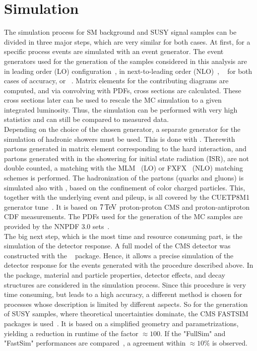 \section{Simulation}
The simulation process for SM background and SUSY signal samples can be divided in three major steps, which are very similar for both cases. At first, for a specific process events are simulated with an event generator. The event generators used for the generation of the samples considered in this analysis are  in leading order (LO) configuration~\cite{Madgraph1,Madgraph2,Madgraph3}, \MADANDMC in next-to-leading order (NLO)~\cite{Madgraph1,AMCATNLO}, \PYTHIA~\cite{Pythia} for both cases of accuracy, or \POWHEG~\cite{Powheg1,Powheg2}. Matrix elements for the contributing diagrams are computed, and via convolving with PDFs, cross sections are calculated. These cross sections later can be used to rescale the MC simulation to a given integrated luminosity. Thus, the simulation can be performed with very high statistics and can still be compared to measured data.\\
Depending on the choice of the chosen generator, a separate generator for the simulation of hadronic showers must be used. This is done with \PYTHIA. Therewith partons generated in matrix element corresponding to the hard interaction, and partons generated with \PYTHIA in the showering for \eg initial state radiation (ISR), are not double counted, a matching with the \textsc{MLM}~\cite{Madgraph2} (LO) or \textsc{FXFX}~\cite{AMCATNLO} (NLO) matching schemes is performed. The hadronization of the partons (quarks and gluons) is simulated also with \PYTHIA, based on the confinement of color charged particles.  This, together with the underlying event and pileup, is all covered by the \textsc{CUETP8M1} generator tune~\cite{Tune}. It is based on $7\,\text{Te\hspace{-.08em}V}$ proton-proton CMS and proton-antiproton CDF measurements. The PDFs used for the generation of the MC samples are provided by the \textsc{NNPDF} 3.0 sets~\cite{NNPDF}.\\
The big next step, which is the most time and resource consuming part, is the simulation of the detector response. A full model of the CMS detector was constructed with the \GEANTfour~\cite{Geant} package. Hence, it allows a precise simulation of the detector response for the events generated with the procedure described above. In the \GEANTfour package, material and particle properties, detector effects, and decay structures are considered in the simulation process. Since this procedure is very time consuming, but leads to a high accuracy, a different method is chosen for processes whose description is limited by different aspects. So for the generation of SUSY samples, where theoretical uncertainties dominate, the CMS \textsc{FASTSIM} packages is used~\cite{FastSim}. It is based on a simplified geometry and parametrizations, yielding a reduction in runtime of the factor $\approx100$. If the "FullSim" and "FastSim" performances are compared~\cite{FastSimQuality}, a agreement within $\approx10\%$ is observed.\\
